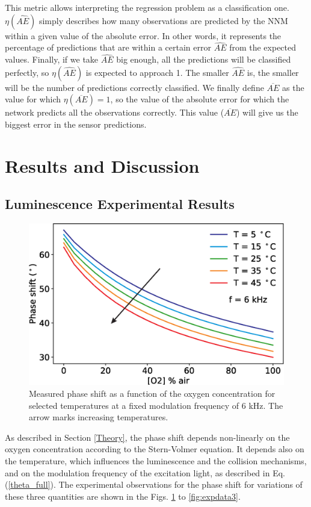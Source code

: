 \documentclass[sensors,article,submit,moreauthors,pdftex,10pt,a4paper]{Definitions/mdpi}
\begin{document}
This metric allows interpreting the regression problem as a classification one. $\eta(\hat{AE})$ simply describes how many observations are predicted by the NNM within a given value of the absolute error. In other words, it represents the percentage of predictions that are within a certain error $\hat{AE}$ from the expected values. Finally, if we take $\hat{AE}$ big enough, all the predictions will be classified perfectly, so $\eta(\hat{AE})$ is expected to approach 1. The smaller $\hat{AE}$ is, the smaller will be the number of predictions correctly classified. We finally define $\overline{AE}$ as the value for which $\eta(\overline{AE})=1$, so the value of the absolute error for which the network predicts all the observations correctly. This value ($\overline{AE}$) will give us the biggest error in the sensor predictions.


\section{Results and Discussion}
\label{Results}

\subsection{Luminescence Experimental Results}

\begin{figure}[b!]
\centering
\includegraphics[width=8.2 cm]{phase_O2_T.eps}
\caption{Measured phase shift as a function of the oxygen concentration for selected temperatures at a fixed modulation frequency of 6 kHz. The arrow marks increasing temperatures.}
\label{fig:expdata1}
\end{figure}

As described in Section \ref{Theory}, the phase shift depends non-linearly on the oxygen concentration according to the Stern-Volmer equation. It depends also on the temperature, which influences the luminescence and the collision mechanisms, and on the modulation frequency of the excitation light, as described in Eq. (\ref{theta_full}). The experimental observations for the phase shift for variations of these three quantities are shown in the Figs. \ref{fig:expdata1} to \ref{fig:expdata3}.
\end{document}
